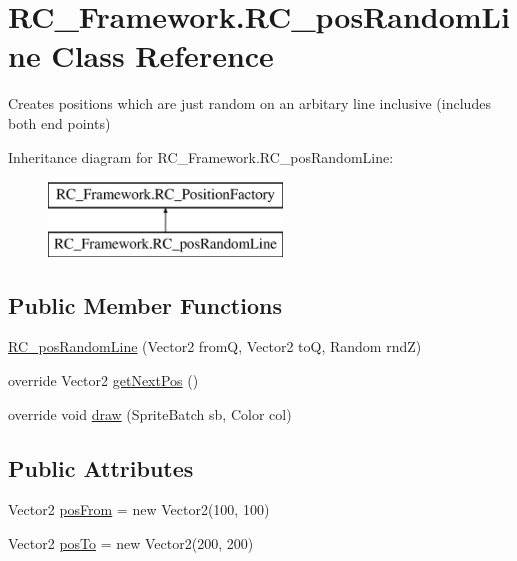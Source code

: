 \hypertarget{class_r_c___framework_1_1_r_c__pos_random_line}{}\section{R\+C\+\_\+\+Framework.\+R\+C\+\_\+pos\+Random\+Line Class Reference}
\label{class_r_c___framework_1_1_r_c__pos_random_line}


Creates positions which are just random on an arbitary line inclusive (includes both end points)  


Inheritance diagram for R\+C\+\_\+\+Framework.\+R\+C\+\_\+pos\+Random\+Line\+:\begin{figure}[H]
\begin{center}
\leavevmode
\includegraphics[height=2.000000cm]{class_r_c___framework_1_1_r_c__pos_random_line}
\end{center}
\end{figure}
\subsection*{Public Member Functions}
\begin{DoxyCompactItemize}
\item 
\mbox{\hyperlink{class_r_c___framework_1_1_r_c__pos_random_line_af5be3614b3a992075132dbc476d50abd}{R\+C\+\_\+pos\+Random\+Line}} (Vector2 fromQ, Vector2 toQ, Random rndZ)
\item 
override Vector2 \mbox{\hyperlink{class_r_c___framework_1_1_r_c__pos_random_line_ad5a37e0d9cc9baea5d0a3f8b6b80bd9e}{get\+Next\+Pos}} ()
\item 
override void \mbox{\hyperlink{class_r_c___framework_1_1_r_c__pos_random_line_aa0c6137f7d33d80534376f2c4f9612e6}{draw}} (Sprite\+Batch sb, Color col)
\end{DoxyCompactItemize}
\subsection*{Public Attributes}
\begin{DoxyCompactItemize}
\item 
Vector2 \mbox{\hyperlink{class_r_c___framework_1_1_r_c__pos_random_line_abd0ae43a0ce2bff5d147fb70159d336d}{pos\+From}} = new Vector2(100, 100)
\item 
Vector2 \mbox{\hyperlink{class_r_c___framework_1_1_r_c__pos_random_line_a94be18c12a06b0b082996478b08f36a1}{pos\+To}} = new Vector2(200, 200)
\end{DoxyCompactItemize}


